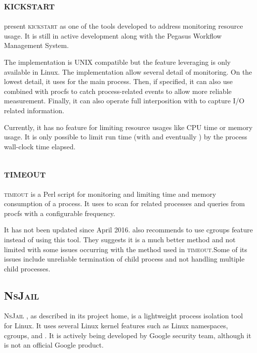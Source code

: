 \subsection{\textsc{kickstart}}

\citet{juvePracticalResourceMonitoring2015} present \textsc{kickstart} \citep[part of][]{PegasusWorkflowManagement2019} as one of the tools developed to address monitoring resource usage.
It is still in active development along with the Pegasus Workflow Management System.

The implementation is UNIX compatible but the feature leveraging  is only available in Linux.
The implementation allow several detail of monitoring.
On the lowest detail, it uses  for the main process.
Then, if specified, it can also use  combined with procfs to catch process-related events to allow more reliable measurement.
Finally, it can also operate full interposition with  to capture I/O related information.

Currently, it has no feature for limiting resource usages like CPU time or memory usage.
It is only possible to limit run time (with  and eventually ) by the process wall-clock time elapsed.


\subsection{\textsc{timeout}}

\textsc{timeout} \citep{shvedScriptMeasureLimit2019} is a Perl script for monitoring and limiting time and memory consumption of a process.
It uses  \citep[ps(1)]{manpages} to scan for related processes and queries from procfs with a configurable frequency.

It has not been updated since April 2016.
\citeauthor{shvedScriptMeasureLimit2019} also recommends to use cgroups feature instead of using this tool.
They suggests it is a much better method and not limited with some issues occurring with the method used in \textsc{timeout}.Some of its issues include unreliable termination of child process and not handling multiple child processes.

\subsection{\textsc{NsJail}}
\label{sec:resource.impl.nsjail}

\textsc{NsJail} \citep{LightweightProcessIsolation2019}, as described in its project home, is a lightweight process isolation tool for Linux.
It uses several Linux kernel features such as Linux namespaces, cgroups, and .
It is actively being developed by Google security team, although it is not an official Google product.

